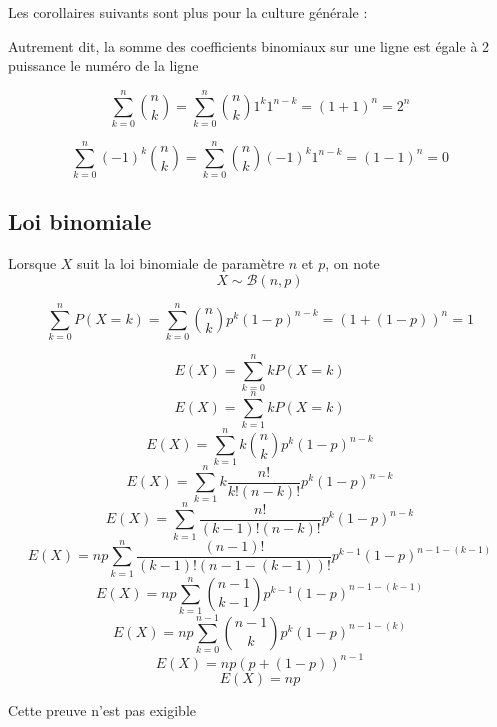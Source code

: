 Les corollaires suivants sont plus pour la culture générale : \newline

\newline

Autrement dit, la somme des coefficients binomiaux sur une ligne est égale à 2 puissance le numéro de la ligne\newline


\begin{preuve}
$$\sum_{k=0}^n \binom{n}{k} = \sum_{k=0}^n \binom{n}{k}1^k1^{n-k} = (1+1)^n = 2^n$$
\end{preuve}

\newline


\begin{preuve}
$$\sum_{k=0}^n (-1)^k\binom{n}{k} = \sum_{k=0}^n \binom{n}{k}(-1)^k1^{n-k} = (1-1)^n = 0$$
\end{preuve}
\subsection{Loi binomiale}
\newline

Lorsque $X$ suit la loi binomiale de paramètre $n$ et $p$, on note $$X\sim \mathscr{B}(n,p)$$

\begin{remarque}
$$\sum_{k=0}^n P(X = k) = \sum_{k=0}^n \binom{n}{k}p^k(1-p)^{n-k} = (1+(1-p))^n = 1$$
\end{remarque}

\newline

\begin{preuve}
$$E(X) = \sum_{k=0}^n kP(X=k)$$
$$E(X) = \sum_{k=1}^n kP(X=k)$$
$$E(X) = \sum_{k=1}^n k \binom{n}{k} p^k(1-p)^{n-k}$$
$$E(X) = \sum_{k=1}^n k \dfrac{n!}{k!(n-k)!} p^k(1-p)^{n-k}$$
$$E(X) = \sum_{k=1}^n \dfrac{n!}{(k-1)!(n-k)!} p^k(1-p)^{n-k}$$
$$E(X) = np\sum_{k=1}^n \dfrac{(n-1)!}{(k-1)!(n-1-(k-1))!}p^{k-1}(1-p)^{n-1-(k-1)}$$
$$E(X) = np\sum_{k=1}^n \binom{n-1}{k-1}p^{k-1}(1-p)^{n-1-(k-1)}$$
$$E(X) = np\sum_{k=0}^{n-1} \binom{n-1}{k}p^{k}(1-p)^{n-1-(k)}$$
$$E(X) = np(p+(1-p))^{n-1}$$
$$E(X) = np$$
\end{preuve}
Cette preuve n'est pas exigible\newline

